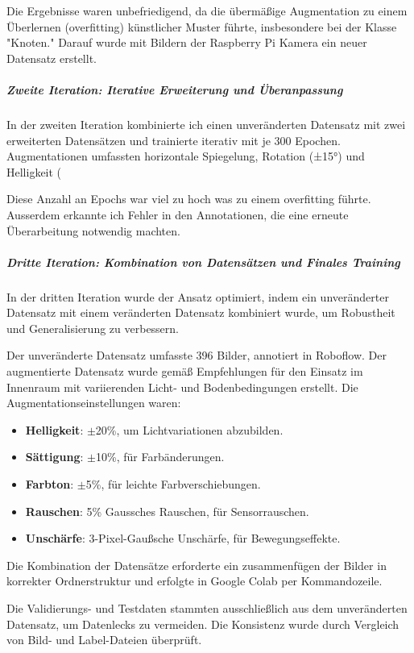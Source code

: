 Die Ergebnisse waren unbefriedigend, da die übermäßige Augmentation zu einem Überlernen (overfitting) künstlicher Muster führte, insbesondere bei der Klasse "Knoten." Darauf wurde mit Bildern der Raspberry Pi Kamera ein neuer Datensatz erstellt.


\subparagraph{Zweite Iteration: Iterative Erweiterung und Überanpassung}

In der zweiten Iteration kombinierte ich einen unveränderten Datensatz mit zwei erweiterten Datensätzen und trainierte iterativ mit je 300 Epochen.
Augmentationen umfassten horizontale Spiegelung, Rotation (±15°) und Helligkeit (

Diese Anzahl an Epochs war viel zu hoch was zu einem overfitting führte. Ausserdem erkannte ich Fehler in den Annotationen, die eine erneute Überarbeitung notwendig machten.

\subparagraph{Dritte Iteration: Kombination von Datensätzen und Finales Training}

In der dritten Iteration wurde der Ansatz optimiert, indem ein unveränderter Datensatz mit einem veränderten Datensatz kombiniert wurde, um Robustheit und Generalisierung zu verbessern.

Der unveränderte Datensatz umfasste 396 Bilder, annotiert in Roboflow. Der augmentierte Datensatz wurde gemäß Empfehlungen für den Einsatz im Innenraum mit variierenden Licht- und Bodenbedingungen erstellt. Die Augmentationseinstellungen waren:

\begin{itemize} 
    \item \textbf{Helligkeit}: $\pm$20\%, um Lichtvariationen abzubilden. 
    \item \textbf{Sättigung}: $\pm$10\%, für Farbänderungen. 
    \item \textbf{Farbton}: $\pm$5\%, für leichte Farbverschiebungen. 
    \item \textbf{Rauschen}: 5\% Gaussches Rauschen, für Sensorrauschen. 
    \item \textbf{Unschärfe}: 3-Pixel-Gaußsche Unschärfe, für Bewegungseffekte. 
\end{itemize}
Die Kombination der Datensätze erforderte ein zusammenfügen der Bilder in korrekter Ordnerstruktur und erfolgte in Google Colab per Kommandozeile.

Die Validierungs- und Testdaten stammten ausschließlich aus dem unveränderten Datensatz, um Datenlecks zu vermeiden. Die Konsistenz wurde durch Vergleich von Bild- und Label-Dateien überprüft.

